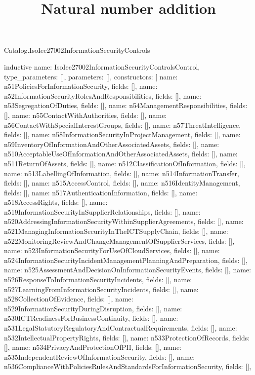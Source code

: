\begin{lexlean}{Catalog.IsoIec27002InformationSecurityControls}
\title{Natural number addition}
\begin{semanticmodule}
inductive{
  name: IsoIec27002InformationSecurityControlsControl,
  type_parameters: [],
  parameters: [],
  constructors: [
    {name: n51PoliciesForInformationSecurity, fields: []},
    {name: n52InformationSecurityRolesAndResponsibilities, fields: []},
    {name: n53SegregationOfDuties, fields: []},
    {name: n54ManagementResponsibilities, fields: []},
    {name: n55ContactWithAuthorities, fields: []},
    {name: n56ContactWithSpecialInterestGroups, fields: []},
    {name: n57ThreatIntelligence, fields: []},
    {name: n58InformationSecurityInProjectManagement, fields: []},
    {name: n59InventoryOfInformationAndOtherAssociatedAssets, fields: []},
    {name: n510AcceptableUseOfInformationAndOtherAssociatedAssets, fields: []},
    {name: n511ReturnOfAssets, fields: []},
    {name: n512ClassificationOfInformation, fields: []},
    {name: n513LabellingOfInformation, fields: []},
    {name: n514InformationTransfer, fields: []},
    {name: n515AccessControl, fields: []},
    {name: n516IdentityManagement, fields: []},
    {name: n517AuthenticationInformation, fields: []},
    {name: n518AccessRights, fields: []},
    {name: n519InformationSecurityInSupplierRelationships, fields: []},
    {name: n520AddressingInformationSecurityWithinSupplierAgreements, fields: []},
    {name: n521ManagingInformationSecurityInTheICTSupplyChain, fields: []},
    {name: n522MonitoringReviewAndChangeManagementOfSupplierServices, fields: []},
    {name: n523InformationSecurityForUseOfCloudServices, fields: []},
    {name: n524InformationSecurityIncidentManagementPlanningAndPreparation, fields: []},
    {name: n525AssessmentAndDecisionOnInformationSecurityEvents, fields: []},
    {name: n526ResponseToInformationSecurityIncidents, fields: []},
    {name: n527LearningFromInformationSecurityIncidents, fields: []},
    {name: n528CollectionOfEvidence, fields: []},
    {name: n529InformationSecurityDuringDisruption, fields: []},
    {name: n530ICTReadinessForBusinessContinuity, fields: []},
    {name: n531LegalStatutoryRegulatoryAndContractualRequirements, fields: []},
    {name: n532IntellectualPropertyRights, fields: []},
    {name: n533ProtectionOfRecords, fields: []},
    {name: n534PrivacyAndProtectionOfPII, fields: []},
    {name: n535IndependentReviewOfInformationSecurity, fields: []},
    {name: n536ComplianceWithPoliciesRulesAndStandardsForInformationSecurity, fields: []},
}
\end{semanticmodule}
\end{lexlean}
